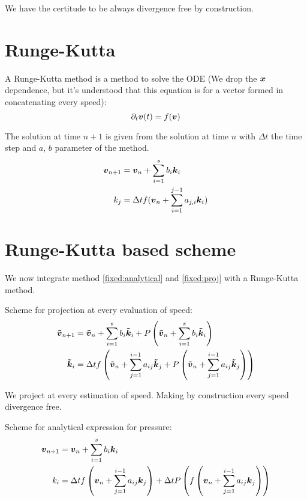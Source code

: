 We have the certitude to be always divergence free by construction.

\section{Runge-Kutta}

A Runge-Kutta method is a method to solve the ODE (We drop the ${\boldsymbol {x}}$ dependence, but it's understood that this equation is for a vector formed in concatenating every speed):
\begin{equation}
\partial_t {\boldsymbol {v}}(t)=f({\boldsymbol {v}})
\end{equation}

The solution at time $n+1$ is given from the solution at time $n$ with $\Delta t$ the time step and $a$, $b$ parameter of the method.
\begin{subequations}
\begin{align}
	{\boldsymbol {v}}_{n+1}&={\boldsymbol {v}}_{n}+\sum_{i=1}^{s}b_{i}{\boldsymbol {k}}_{i}\\
	k_{j}&=\Delta t f({\boldsymbol {v}}_{n}+\sum_{i=1}^{j-1}a_{j,i}{\boldsymbol {k}}_{i})
\end{align}
\end{subequations}

\section{Runge-Kutta based scheme}
\label{fixed:sect:runge-kutta}
We now integrate method \ref{fixed:analytical} and \ref{fixed:proj} with a Runge-Kutta method.

Scheme for projection at every evaluation of speed:
\begin{subequations}
\begin{align}
{\boldsymbol {\tilde{v}}}_{n+1}&={\boldsymbol {\tilde{v}}}_{n}+\sum_{i=1}^{s}b_{i}{\boldsymbol {\tilde{k}}}_{i}+P\left({\boldsymbol {\tilde{v}}}_{n}+\sum_{i=1}^{s}b_{i}{\boldsymbol {\tilde{k}}}_{i}\right)\\
{\boldsymbol {\tilde{k}}}_{i}&=\Delta t f\left({\boldsymbol {\tilde{v}}}_{n}+\sum_{j=1}^{i-1}a_{ij}{\boldsymbol {\tilde{k}}}_{j}+P\left({\boldsymbol {\tilde{v}}}_{n}+\sum_{j=1}^{i-1}a_{ij}{\boldsymbol {\tilde{k}}}_{j}\right)\right)
\end{align}
\end{subequations}

We project at every estimation of speed. Making by construction every speed divergence free.

Scheme for analytical expression for pressure:
\begin{subequations}
\begin{align}
	{\boldsymbol {v}}_{n+1}&={\boldsymbol {v}}_{n}+\sum_{i=1}^{s}b_{i}{\boldsymbol {k}}_{i}\\
	k_{i}&=\Delta t f\left({\boldsymbol {v}}_{n}+\sum_{j=1}^{i-1}a_{ij}{\boldsymbol {k}}_{j}\right)+\Delta t P\left(f\left({\boldsymbol {v}}_{n}+\sum_{j=1}^{i-1}a_{ij}{\boldsymbol {k}}_{j}\right)\right)
\end{align}
\end{subequations}

